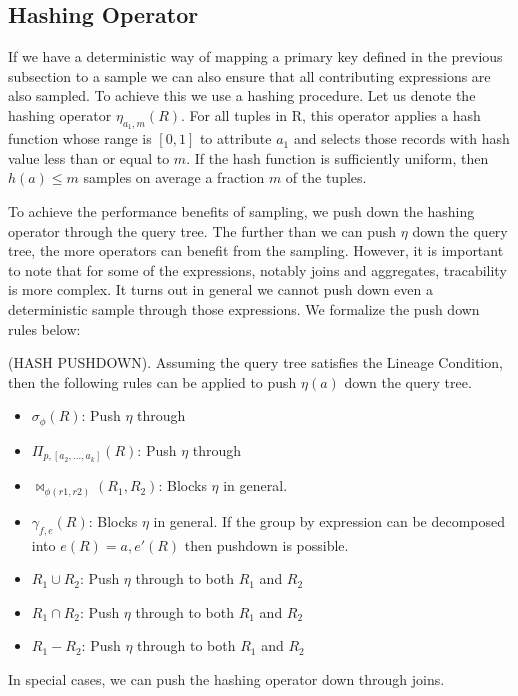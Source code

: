 \subsection{Hashing Operator}
If we have a deterministic way of mapping a primary key defined in the previous subsection to a sample we can also ensure that all contributing expressions are also sampled. 
To achieve this we use a hashing procedure.
Let us denote the hashing operator $\eta_{a_1, m}(R)$. 
For all tuples in R, this operator applies a hash function whose range is $[0,1]$ to attribute $a_1$  and selects those records with hash value less than or equal to $m$.
If the hash function is sufficiently uniform, then $h(a) \le m$ samples on average a fraction $m$ of the tuples.

To achieve the performance benefits of sampling, we push down the hashing operator through the query tree.
The further than we can push $\eta$ down the query tree, the more operators can benefit from the sampling.
However, it is important to note that for some of the expressions, notably joins and aggregates, tracability is more complex.
It turns out in general we cannot push down even a deterministic sample through those expressions.
We formalize the push down rules below:
\begin{proposition}
(HASH PUSHDOWN). Assuming the query tree satisfies the Lineage Condition, then the following rules can be applied to push $\eta(a)$ down the query tree. 
\begin{itemize}\vspace{-.45em}
\item $\sigma_{\phi}(R)$: Push $\eta$ through \vspace{-.45em}
\item $\Pi_{p,[a_2,...,a_k]}(R)$: Push $\eta $ through \vspace{-.45em}
\item $\bowtie_{\phi (r1,r2)}(R_1,R_2)$: Blocks $\eta $ in general. 
\item $\gamma_{f,e}(R)$: Blocks $\eta$ in general. If the group by expression can be decomposed into $e(R) = a, e'(R)$ then pushdown is possible.\vspace{-.45em}
\item $R_1 \cup R_2$: Push $\eta $ through to both $R_1$ and $R_2$
\item $R_1 \cap R_2$: Push $\eta $ through to both $R_1$ and $R_2$
\item $R_1 - R_2$: Push $\eta $ through to both $R_1$ and $R_2$
\end{itemize}
\end{proposition}
In special cases, we can push the hashing operator down through joins. 

